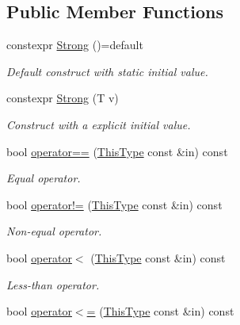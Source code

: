 \subsection*{Public Member Functions}
\begin{DoxyCompactItemize}
\item 
constexpr \hyperlink{structvt_1_1util_1_1strong_1_1detail_1_1_strong_aacc46aaa7ec00051d3056b7cbd850586}{Strong} ()=default
\begin{DoxyCompactList}\small\item\em Default construct with static initial value. \end{DoxyCompactList}\item 
constexpr \hyperlink{structvt_1_1util_1_1strong_1_1detail_1_1_strong_a25fead6e8aff403d57fa5a4718e3a0ef}{Strong} (T v)
\begin{DoxyCompactList}\small\item\em Construct with a explicit initial value. \end{DoxyCompactList}\item 
bool \hyperlink{structvt_1_1util_1_1strong_1_1detail_1_1_strong_ac32855789c8e77843e7b6a5b63698f67}{operator==} (\hyperlink{structvt_1_1util_1_1strong_1_1detail_1_1_strong_a510d40741bda362d97a4753919a577dd}{This\+Type} const \&in) const
\begin{DoxyCompactList}\small\item\em Equal operator. \end{DoxyCompactList}\item 
bool \hyperlink{structvt_1_1util_1_1strong_1_1detail_1_1_strong_aa6dd594219a084feae812a5975240963}{operator!=} (\hyperlink{structvt_1_1util_1_1strong_1_1detail_1_1_strong_a510d40741bda362d97a4753919a577dd}{This\+Type} const \&in) const
\begin{DoxyCompactList}\small\item\em Non-\/equal operator. \end{DoxyCompactList}\item 
bool \hyperlink{structvt_1_1util_1_1strong_1_1detail_1_1_strong_a8f82e9a4d971a1b80b84234661a6ca58}{operator$<$} (\hyperlink{structvt_1_1util_1_1strong_1_1detail_1_1_strong_a510d40741bda362d97a4753919a577dd}{This\+Type} const \&in) const
\begin{DoxyCompactList}\small\item\em Less-\/than operator. \end{DoxyCompactList}\item 
bool \hyperlink{structvt_1_1util_1_1strong_1_1detail_1_1_strong_a5f36a542fc6a5716037c606ea090d635}{operator$<$=} (\hyperlink{structvt_1_1util_1_1strong_1_1detail_1_1_strong_a510d40741bda362d97a4753919a577dd}{This\+Type} const \&in) const

\end{DoxyCompactItemize}
